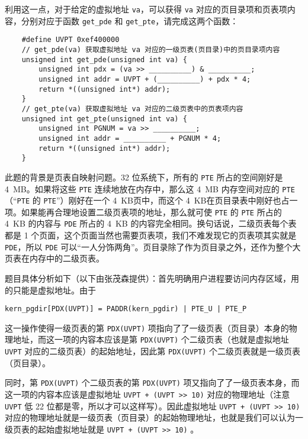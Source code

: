 \begin{problems}
        利用这一点，对于给定的虚拟地址 \verb|va|，可以获得 \verb|va| 对应的页目录项和页表项内容，分别对应于函数 \verb|get_pde| 和 \verb|get_pte|，请完成这两个函数：
        \begin{verbatim}
    #define UVPT 0xef400000
    // get_pde(va) 获取虚拟地址 va 对应的一级页表(页目录)中的页目录项内容
    unsigned int get_pde(unsigned int va) {
        unsigned int pdx = (va >> __________) & __________;
        unsigned int addr = UVPT + (__________) + pdx * 4;
        return *((unsigned int*) addr);
    }
    // get_pte(va) 获取虚拟地址 va 对应的二级页表中的页表项内容
    unsigned int get_pte(unsigned int va) {
        unsigned int PGNUM = va >> __________;
        unsigned int addr = __________ + PGNUM * 4;
        return *((unsigned int*) addr);
    }
        \end{verbatim}
        \sol 此题的背景是页表自映射问题。32 位系统下，所有的 \verb|PTE| 所占的空间刚好是 \SI{4}{MB}。如果将这些 \verb|PTE| 连续地放在内存中，那么这 \SI{4}{MB} 内存空间对应的 \verb|PTE|（“\verb|PTE| 的 \verb|PTE|”）刚好在一个 \SI{4}{KB}页中，而这个 \SI{4}{KB}在页目录表中刚好也占一项。如果能再合理地设置二级页表项的地址，那么就可使 \verb|PTE| 的 \verb|PTE| 所占的 \SI{4}{KB} 的内容与 \verb|PDE| 所占的 \SI{4}{KB} 的内容完全相同。换句话说，二级页表每个表都是 1 个页面，这个页面当然也需要页表项，我们不难发现它的页表项其实就是 \verb|PDE|，所以 \verb|PDE| 可以“一人分饰两角”。页目录除了作为页目录之外，还作为整个大页表在内存中的二级页表。
        
        题目具体分析如下（以下由张茂森提供）：首先明确用户进程要访问内存区域，用的只能是虚拟地址。由于
        \begin{center}
            \verb+kern_pgdir[PDX(UVPT)] = PADDR(kern_pgdir) | PTE_U | PTE_P+
        \end{center}
        这一操作使得一级页表的第 \verb|PDX(UVPT)| 项指向了了一级页表（页目录）本身的物理地址，而这一项的内容本应该是第 \verb|PDX(UVPT)| 个二级页表（也就是虚拟地址 \verb|UVPT| 对应的二级页表）的起始地址，因此第 \verb|PDX(UVPT)| 个二级页表就是一级页表（页目录）。

        同时，第 \verb|PDX(UVPT)| 个二级页表的第 \verb|PDX(UVPT)| 项⼜指向了了一级页表本身，而这一项的内容本应该是虚拟地址 \verb|UVPT + (UVPT >> 10)| 对应的物理地址（注意 \verb|UVPT| 低 22 位都是零，所以才可以这样写）。因此虚拟地址 \verb|UVPT + (UVPT >> 10)| 对应的物理地址就是一级页表（页目录）的起始物理地址，也就是我们可以认为一级页表的起始虚拟地址就是 \verb|UVPT + (UVPT >> 10)| 。


\end{problems}
